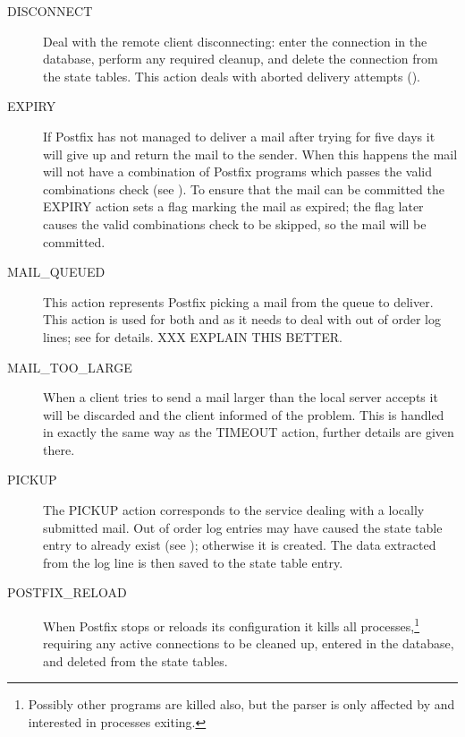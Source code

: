 \begin{description}
    \item [DISCONNECT] Deal with the remote client disconnecting: enter the
        connection in the database, perform any required cleanup, and
        delete the connection from the state tables.  This action deals
        with aborted delivery attempts
        ().

    \item [EXPIRY] If Postfix has not managed to deliver a mail after
        trying for five days it will give up and return the mail to the
        sender.  When this happens the mail will not have a combination of
        Postfix programs which passes the valid combinations check (see
        ).  To ensure that the mail can
        be committed the EXPIRY action sets a flag marking the mail as
        expired; the flag later causes the valid combinations check to be
        skipped, so the mail will be committed.

    \item [MAIL\_QUEUED] This action represents Postfix picking a mail from
        the queue to deliver. This action is used for both 
        and  as it needs to deal with out of order log
        lines; see  for details.
        XXX EXPLAIN THIS BETTER\@.

    \item [MAIL\_TOO\_LARGE] When a client tries to send a mail larger than
        the local server accepts it will be discarded and the client
        informed of the problem.  This is handled in exactly the same way
        as the TIMEOUT action, further details are given there.

    \item [PICKUP] The PICKUP action corresponds to the 
        service dealing with a locally submitted mail.  Out of order log
        entries may have caused the state table entry to already exist (see
        ); otherwise it is
        created.  The data extracted from the log line is then saved to the
        state table entry.

    \item [POSTFIX\_RELOAD] When Postfix stops or reloads its configuration
        it kills all  processes,\footnote{Possibly other
        programs are killed also, but the parser is only affected by and
        interested in  processes exiting.} requiring any
        active connections to be cleaned up, entered in the database, and
        deleted from the state tables.


\end{description}
